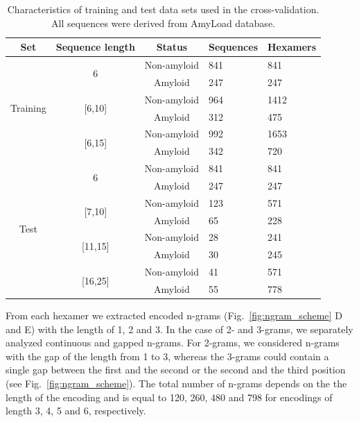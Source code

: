 \documentclass[fleqn,10pt,twoside]{gcb15submission}
\begin{document}
\begin{table}
\centering
\small
\caption{Characteristics of training and test data sets used in the 
cross-validation. All sequences were derived from AmyLoad database.}
\label{tab:data_sets}
\begin{tabular}{cccll}
\toprule
Set & Sequence length & Status & Sequences & Hexamers \\ 
\midrule
\multirow{6}{*}{Training} & \multirow{2}{*}{6} & Non-amyloid & 841 & 841 
\\
 &  & \cellcolor[gray]{0.85}Amyloid & \cellcolor[gray]{0.85}247 & 
\cellcolor[gray]{0.85}247 \\
 \cline{2-5}
 & \multirow{2}{*}{{[}6,10{]}} & Non-amyloid & 964 & 1412 \\
 &  & \cellcolor[gray]{0.85}Amyloid & \cellcolor[gray]{0.85}312 & 
\cellcolor[gray]{0.85}475 \\
 \cline{2-5}
 & \multirow{2}{*}{{[}6,15{]}} & Non-amyloid & 992 & 1653 \\
 &  & \cellcolor[gray]{0.85}Amyloid & \cellcolor[gray]{0.85}342 & 
\cellcolor[gray]{0.85}720 \\
 \hline
 \hline
\multirow{8}{*}{Test} & \multirow{2}{*}{6} & Non-amyloid & 841 & 841 \\
 &  & \cellcolor[gray]{0.85}Amyloid & \cellcolor[gray]{0.85}247 & 
\cellcolor[gray]{0.85}247 \\
 \cline{2-5}
 & \multirow{2}{*}{{[}7,10{]}} & Non-amyloid & 123 & 571 \\
 &  & \cellcolor[gray]{0.85}Amyloid & \cellcolor[gray]{0.85}65 & 
\cellcolor[gray]{0.85}228 \\
 \cline{2-5}
 & \multirow{2}{*}{{[}11,15{]}} & Non-amyloid & 28 & 241 \\
 &  & \cellcolor[gray]{0.85}Amyloid & \cellcolor[gray]{0.85}30 & 
\cellcolor[gray]{0.85}245 \\
 \cline{2-5}
 & \multirow{2}{*}{{[}16,25{]}} & Non-amyloid & 41 & 571 \\
 &  & \cellcolor[gray]{0.85}Amyloid & \cellcolor[gray]{0.85}55 & 
\cellcolor[gray]{0.85}778 \\
 \bottomrule
\end{tabular}
\end{table}

  From each hexamer we extracted encoded n-grams (Fig.~\ref{fig:ngram_scheme} D and E) with 
the length of 1, 2 and 3. In the case of 2- and 3-grams, we separately analyzed 
continuous and gapped n-grams. 
For 2-grams, we considered n-grams with the gap of the length from 1 to 3, 
whereas the 3-grams could contain a single gap between the first and the second 
or the second and the third position (see Fig.~\ref{fig:ngram_scheme}). The 
total number of n-grams depends on the the length of the encoding and is equal 
to 120, 260, 480 and 798 for encodings of length 3, 4, 5 and 6, respectively.
\end{document}
